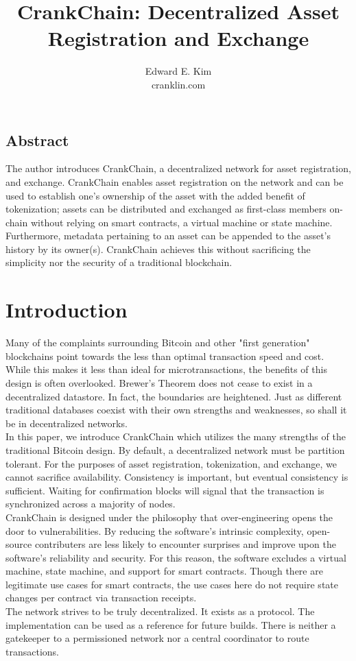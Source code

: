 \documentclass[10pt,twocolumn]{article}
\begin{document}
\title{CrankChain: Decentralized Asset Registration and Exchange}
\author{
{\normalsize Edward E. Kim}\\
\normalsize cranklin.com
}
\date{}

\maketitle
\subsection*{Abstract}
The author introduces CrankChain, a decentralized network for asset registration, and exchange.  CrankChain enables asset registration on the network and can be used to establish one's ownership of the asset with the added benefit of tokenization; assets can be distributed and exchanged as first-class members on-chain without relying on smart contracts, a virtual machine or state machine.  Furthermore, metadata pertaining to an asset can be appended to the asset's history by its owner(s).  CrankChain achieves this without sacrificing the simplicity nor the security of a traditional blockchain.

\section{Introduction}
Many of the complaints surrounding Bitcoin and other "first generation" blockchains point towards the less than optimal transaction speed and cost.  While this makes it less than ideal for microtransactions, the benefits of this design is often overlooked.  Brewer's Theorem does not cease to exist in a decentralized datastore.  In fact, the boundaries are heightened.  Just as different traditional databases coexist with their own strengths and weaknesses, so shall it be in decentralized networks.\\
In this paper, we introduce CrankChain which utilizes the many strengths of the traditional Bitcoin design.  By default, a decentralized network must be partition tolerant.  For the purposes of asset registration, tokenization, and exchange, we cannot sacrifice availability.  Consistency is important, but eventual consistency is sufficient.  Waiting for confirmation blocks will signal that the transaction is synchronized across a majority of nodes.  \\
CrankChain is designed under the philosophy that over-engineering opens the door to vulnerabilities.  By reducing the software's intrinsic complexity, open-source contributers are less likely to encounter surprises and improve upon the software's reliability and security.  For this reason, the software excludes a virtual machine, state machine, and support for smart contracts.  Though there are legitimate use cases for smart contracts, the use cases here do not require state changes per contract via transaction receipts.  \\
The network strives to be truly decentralized.  It exists as a protocol.  The implementation can be used as a reference for future builds.  There is neither a gatekeeper to a permissioned network nor a central coordinator to route transactions.
\end{document}
